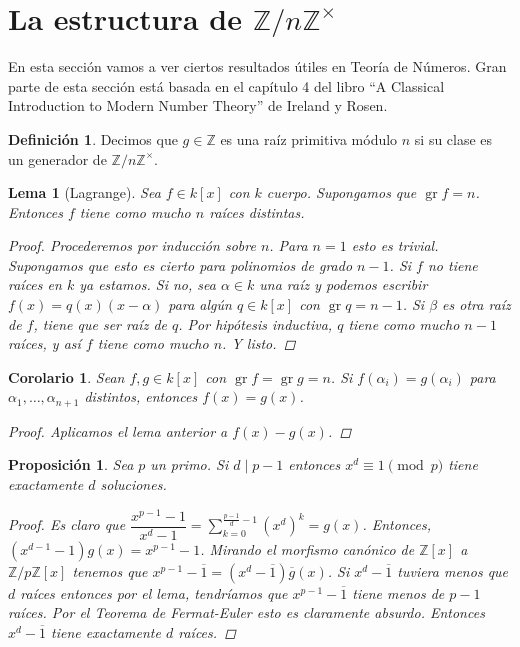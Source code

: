 \documentclass[12pt]{book}
\newtheorem{lem}[teo]{Lema}
\newtheorem{prop}[teo]{Proposición}
\newtheorem{cor}[teo]{Corolario}
\theoremstyle{definition}
\newtheorem{defn}[teo]{Definición}
\newcommand{\ZZ}{\mathbb{Z}}      %
\DeclareMathOperator{\gr}{gr}
\begin{document}
\section{La estructura de \texorpdfstring{$\ZZ/n\ZZ^\times$}{Z/nZ*}}

En esta sección vamos a ver ciertos resultados útiles en Teoría de Números. Gran parte de esta sección está basada en el capítulo 4 del libro "`A Classical Introduction to Modern Number Theory"' de Ireland y Rosen.

\begin{defn}
Decimos que $g\in\ZZ$ es una raíz primitiva módulo $n$ si su clase es un generador de $\ZZ/n\ZZ^\times$.
\end{defn}

\begin{lem}[Lagrange]
Sea $f\in k[x]$ con $k$ cuerpo. Supongamos que $\gr f= n$. Entonces $f$ tiene como mucho $n$ raíces distintas.
\begin{proof}
Procederemos por inducción sobre $n$. Para $n=1$ esto es trivial. Supongamos que esto es cierto para polinomios de grado $n-1$. Si $f$ no tiene raíces en $k$ ya estamos. Si no, sea $\alpha\in k$ una raíz y podemos escribir $f(x) = q(x)(x-\alpha)$ para algún $q\in k[x]$ con $\gr q = n-1$. Si $\beta$ es otra raíz de $f$, tiene que ser raíz de $q$. Por hipótesis inductiva, $q$ tiene como mucho $n-1$ raíces, y así $f$ tiene como mucho $n$. Y listo.
\end{proof}
\end{lem}

\begin{cor}
Sean $f,g\in k[x]$ con $\gr f = \gr g = n$. Si $f(\alpha_i) = g(\alpha_i)$ para $\alpha_1,\ldots , \alpha_{n+1}$ distintos, entonces $f(x)=g(x)$.
\begin{proof}
Aplicamos el lema anterior a $f(x)-g(x)$.
\end{proof}
\end{cor}

\begin{prop}
Sea $p$ un primo. Si $d\mid p-1$ entonces $x^d\equiv 1\pmod{p}$ tiene exactamente $d$ soluciones.
\begin{proof}
Es claro que $\dfrac{x^{p-1}-1}{x^d -1 } = \displaystyle\sum_{k=0}^{\frac{p-1}{d}-1}(x^d)^{k} = g(x)$. Entonces, $(x^{d-1}-1)g(x) = x^{p-1}-1$. Mirando el morfismo canónico de $\ZZ[x]$ a $\ZZ/p\ZZ[x]$ tenemos que $x^{p-1}-\overline{1} = (x^d - \overline{1})\overline{g}(x)$. Si $x^d-\overline{1}$ tuviera menos que $d$ raíces entonces por el lema, tendríamos que $x^{p-1}-\overline{1}$ tiene menos de $p-1$ raíces. Por el Teorema de Fermat-Euler esto es claramente absurdo. Entonces $x^{d}-\overline{1}$ tiene exactamente $d$ raíces.
\end{proof}
\end{prop}
\end{document}
